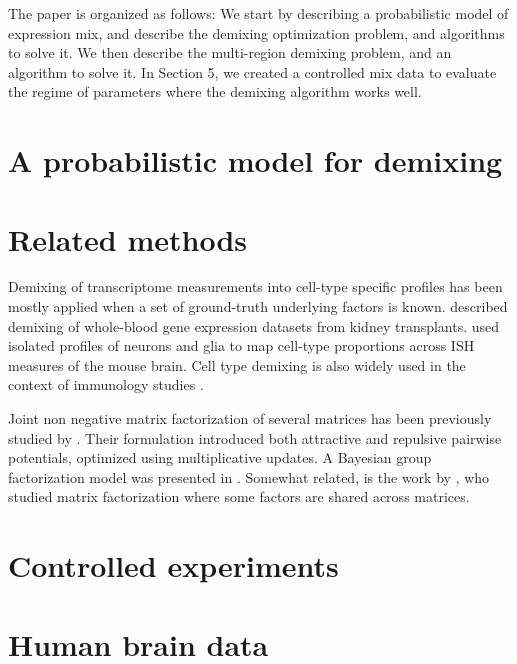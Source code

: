 \documentclass{article} %
\begin{document}
The paper is organized as follows: We start by describing a probabilistic model of expression mix, and describe the demixing optimization problem, and algorithms to solve it. We then describe the multi-region demixing problem, and an algorithm to solve it. In Section 5, we created a controlled mix data to evaluate the regime of parameters where the demixing algorithm works well. 

\section{A probabilistic model for demixing}


\section{Related methods}
Demixing of transcriptome measurements into cell-type specific profiles has been mostly applied when a set of ground-truth underlying factors is known. \citet{shen2010cell} described demixing of 
whole-blood gene expression datasets from kidney transplants. \citet{grange2014cell} used isolated profiles of neurons and glia \cite{okaty2011cell} to map cell-type proportions across ISH measures of the mouse brain. Cell type demixing is also widely used in the context of immunology studies \cite{shen2013computational}.

Joint non negative matrix factorization of several matrices has been previously studied by \citet{lee2009group}. Their formulation introduced  both attractive and repulsive pairwise potentials, optimized using multiplicative updates. A Bayesian group factorization model was presented in \citet{shin2012bayesian}. Somewhat related, is the work by \citet{wang2012group}, who studied matrix factorization where some factors are shared across matrices.

\section{Controlled experiments}
\label{Synthetic_exp}


\section{Human brain data}
\label{Human_exp}

\end{document}
